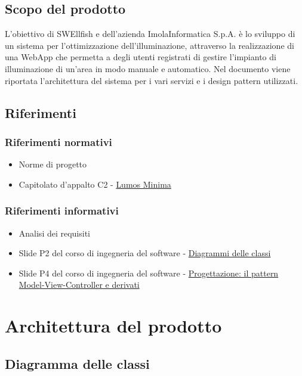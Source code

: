 \documentclass[12pt]{article}
\begin{document}
\subsection{Scopo del prodotto}
L’obiettivo di SWEllfish e dell’azienda ImolaInformatica S.p.A. è lo sviluppo di un sistema per l’ottimizzazione dell’illuminazione, attraverso la realizzazione di una WebApp che permetta a degli utenti registrati di gestire l'impianto di illuminazione
di un'area in modo manuale e automatico. Nel documento viene riportata l'architettura del sistema per i vari servizi e i design pattern utilizzati.

\subsection{Riferimenti}
\subsubsection{Riferimenti normativi}
\begin{itemize}
	\item Norme di progetto
	\item Capitolato d'appalto C2 - \href{https://www.math.unipd.it/~tullio/IS-1/2022/Progetto/C2.pdf}{Lumos Minima}
\end{itemize}
\subsubsection{Riferimenti informativi}
\begin{itemize}
	\item Analisi dei requisiti
	\item Slide P2 del corso di ingegneria del software - \href{https://www.math.unipd.it/~rcardin/swea/2023/Diagrammi%20delle%20Classi.pdf}{Diagrammi delle classi}
	\item Slide P4 del corso di ingegneria del software - \href{https://www.math.unipd.it/~rcardin/sweb/2022/L02.pdf}{Progettazione: il pattern Model-View-Controller e derivati}
\end{itemize}

\section{Architettura del prodotto}



\subsection{Diagramma delle classi}
\end{document}
